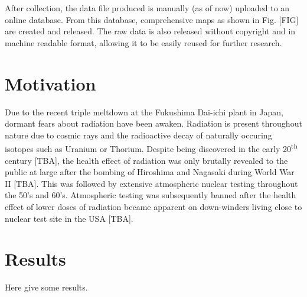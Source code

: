 \documentclass[11pt]{article}
\begin{document}
After collection, the data file produced is manually (as of now) uploaded to an online database. From this database, comprehensive maps as shown in Fig. [FIG] 
are created and released. The raw data is also released without copyright and in machine readable format, allowing it to be easily reused for further research.


\section*{Motivation}
\label{sec:motivation}

Due to the recent triple meltdown at the Fukushima Dai-ichi plant in Japan, dormant fears about radiation have been awaken.
Radiation is present throughout nature due to cosmic rays and the radioactive decay of naturally occuring isotopes such as Uranium or Thorium.
Despite being discovered in the early 20\textsuperscript{th} century [TBA], the health effect of radiation was only brutally revealed to the public at
large after the bombing of Hiroshima and Nagasaki during World War II [TBA]. This was followed by extensive atmospheric nuclear testing throughout the 50's and 60's.
Atmospheric testing was subsequently banned after the health effect of lower doses of radiation became apparent on down-winders living close to
nuclear test site in the USA [TBA].

\section*{Results}
\label{sec:results}

Here give some results.

\end{document}
